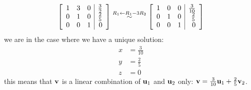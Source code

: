 \begin{solution}
\begin{align*}
\left[ \begin{array}{rrr|r} 1 & 3 & 0 & \frac{3}{2} \\ 0 & 1 & 0 & \frac{2}{5}\\  0 & 0 & 1 & 0 \end{array}\right] \stackrel{R_1\leftarrow R_1-3R_2}{\sim}
\left[ \begin{array}{rrr|r} 1 & 0 & 0 & \frac{3}{10} \\ 0 & 1 & 0 & \frac{2}{5}\\  0 & 0 & 1 & 0 \end{array}\right]
\end{align*}
we are in the case where we have a unique solution:
\begin{align*}
x&=\frac{3}{10}\\
y&=\frac{2}{5}\\
z&=0
\end{align*}
this means that ${\bf v}$ is a linear combination of ${\bf u}_1$ and ${\bf u}_2$ only: ${\bf v}=\frac{3}{10}{\bf u}_1+\frac{2}{5}{\bf v}_2$.
\end{solution}

